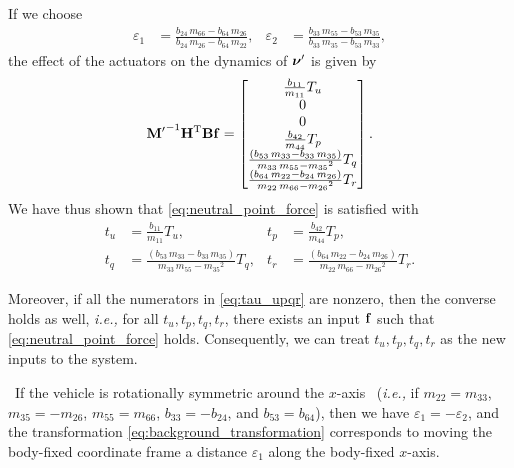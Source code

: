 If we choose
\begin{align}
    \varepsilon_1 &= \frac{b_{24}\,m_{66}-b_{64}\,m_{26}}{b_{24}\,m_{26}-b_{64}\,m_{22}}, &
    \varepsilon_2 &= \frac{b_{33}\,m_{55}-b_{53}\,m_{35}}{b_{33}\,m_{35}-b_{53}\,m_{33}},
\end{align}
the effect of the actuators on the dynamics of $\bm{\nu}^{\prime}$ is given by
\begin{equation}
    {\mathbf{M}^{\prime}}^{-1}\mathbf{H}^{\mathrm{T}}\mathbf{B}\mathbf{f} =
    \begin{bmatrix}
        \frac{b_{11}}{m_{11}} T_{u} \\
        0 \\ 
        0 \\ 
        \frac{b_{42}}{m_{44}} T_{p} \\ 
        \frac{\left(b_{53}\,m_{33}-b_{33}\,m_{35}\right)}{m_{33}\,m_{55}-{m_{35}}^2} T_{q} \\ 
        \frac{\left(b_{64}\,m_{22}-b_{24}\,m_{26}\right)}{m_{22}\,m_{66}-{m_{26}}^2} T_{r}
    \end{bmatrix}.
\end{equation}
We have thus shown that \eqref{eq:neutral_point_force} is satisfied with
\begin{subequations}
    \begin{align}
        t_u &= \frac{b_{11}}{m_{11}} T_{u}, &
        t_p &= \frac{b_{42}}{m_{44}} T_{p}, \\
        t_q &= \frac{\left(b_{53}\,m_{33}-b_{33}\,m_{35}\right)}{m_{33}\,m_{55}-{m_{35}}^2} T_{q}, &
        t_r &= \frac{\left(b_{64}\,m_{22}-b_{24}\,m_{26}\right)}{m_{22}\,m_{66}-{m_{26}}^2} T_{r}.
    \end{align} 
    \label{eq:tau_upqr}
\end{subequations}

\noindent Moreover, if all the numerators in \eqref{eq:tau_upqr} are nonzero, then the converse holds as well, \emph{i.e.,} for all $t_u, t_p, t_q, t_r$, there exists an input $\mathbf{f}$ such that \eqref{eq:neutral_point_force} holds.
Consequently, we can treat $t_u, t_p, t_q, t_r$ as the new inputs to the system.

\begin{rmk*}
    ~If the vehicle is rotationally symmetric around the $x$-axis ~(\emph{i.e.,} if $m_{22} = m_{33}$, $m_{35} = -m_{26}$, $m_{55} = m_{66}$, $b_{33} = -b_{24}$, and $b_{53} = b_{64}$), then we have $\varepsilon_1 = -\varepsilon_2$, and the transformation \eqref{eq:background_transformation} corresponds to moving the body-fixed coordinate frame a distance $\varepsilon_1$ along the body-fixed $x$-axis.
\end{rmk*}

